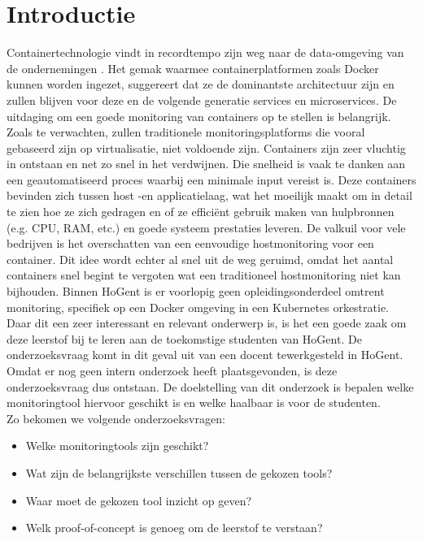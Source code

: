 
\section{Introductie} %
\label{sec:introductie}
Containertechnologie vindt in recordtempo zijn weg naar de data-omgeving van de ondernemingen \autocite{Cole2016}. Het gemak waarmee containerplatformen zoals Docker kunnen worden ingezet, suggereert dat ze de dominantste architectuur zijn en zullen blijven voor deze en de volgende generatie services en microservices.
De uitdaging om een goede monitoring van containers op te stellen is belangrijk. Zoals te verwachten, zullen traditionele monitoringsplatforms die vooral gebaseerd zijn op virtualisatie, niet voldoende zijn. Containers zijn zeer vluchtig in ontstaan en net zo snel in het verdwijnen. Die snelheid is vaak te danken aan een geautomatiseerd proces waarbij een minimale input vereist is. Deze containers bevinden zich tussen host -en applicatielaag, wat het moeilijk maakt om in detail te zien hoe ze zich gedragen en of ze efficiënt gebruik maken van hulpbronnen (e.g. CPU, RAM, etc.) en goede systeem prestaties leveren. De valkuil voor vele bedrijven is het overschatten van een eenvoudige hostmonitoring voor een container. Dit idee wordt echter al snel uit de weg geruimd, omdat het aantal containers snel begint te vergoten wat een traditioneel hostmonitoring niet kan bijhouden.
Binnen HoGent is er voorlopig geen opleidingsonderdeel omtrent monitoring, specifiek op een Docker omgeving in een Kubernetes orkestratie. Daar dit een zeer interessant en relevant onderwerp is, is het een goede zaak om deze leerstof bij te leren aan de toekomstige studenten van HoGent. De onderzoeksvraag komt in dit geval uit van een docent tewerkgesteld in HoGent. Omdat er nog geen intern onderzoek heeft plaatsgevonden, is deze onderzoeksvraag dus ontstaan. De doelstelling van dit onderzoek is bepalen welke monitoringtool hiervoor geschikt is en welke haalbaar is voor de studenten. 
\\
Zo bekomen we volgende onderzoeksvragen:

\begin{itemize}
    \item Welke monitoringtools zijn geschikt?
    \item Wat zijn de belangrijkste verschillen tussen de gekozen tools?
    \item Waar moet de gekozen tool inzicht op geven?
    \item Welk proof-of-concept is genoeg om de leerstof te verstaan?
\end{itemize}

